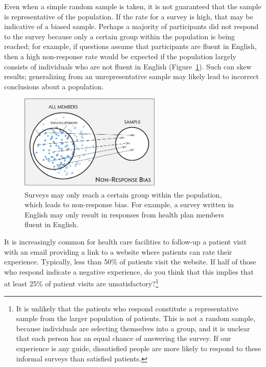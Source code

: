 Even when a simple random sample is taken, it is not guaranteed that the sample is representative of the population. If the  rate  for a survey is high, that may be indicative of a biased sample. Perhaps a majority of participants did not respond to the survey because only a certain group within the population is being reached; for example, if questions assume that participants are fluent in English, then a high non-response rate would be expected if the population largely consists of individuals who are not fluent in English (Figure~\ref{sampleNonResponseHealthPlan}). Such   can skew results; generalizing from an unrepresentative sample may likely lead to incorrect conclusions about a population. 

\begin{figure}[h!]
	\centering
	{\includegraphics[width=0.60\textwidth]{ch_intro_to_data_oi_biostat/figures/sampleHealthPlan/sampleNonResponseHealthPlan.png}
	\caption{Surveys may only reach a certain group within the population, which leads to non-response bias. For example, a survey written in English may only result in responses from health plan members fluent in English.}}
	\label{sampleNonResponseHealthPlan}
\end{figure}


\begin{exercise}
It is increasingly common for health care facilities to follow-up a patient visit with an email providing a link to a website where patients can rate their experience.  Typically, less than 50\% of patients visit the website. If half of those who respond indicate a negative experience, do you think that this implies that at least 25\% of patient visits are unsatisfactory?\footnote{It is unlikely that the patients who respond constitute a representative sample from the larger population of patients. This is not a random sample, because individuals are selecting themselves into a group, and it is unclear that each person has an equal chance of answering the survey. If our experience is any guide, dissatisfied people are more likely to respond to these informal surveys than satisfied patients.}
\end{exercise}

